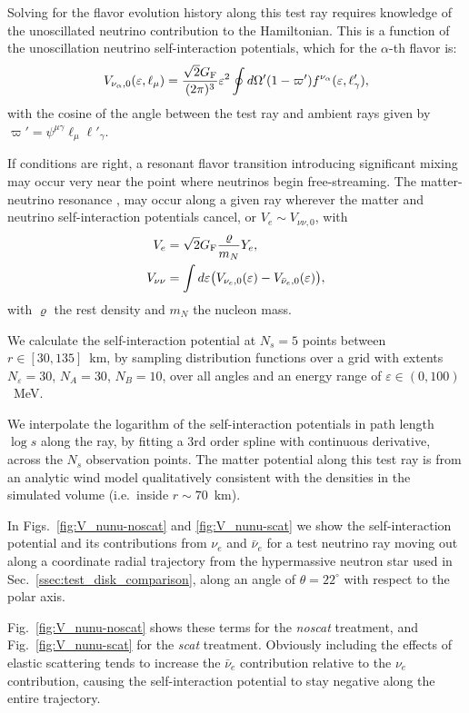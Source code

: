 \documentclass[aps,floatfix,prd,superscriptaddress,twocolumn]{revtex4-1}
\newcommand{\todo}[1]{\marginpar{\tiny{\textcolor{red}{#1}}}}
\renewcommand\todo[1]{} %
\begin{document}
Solving for the flavor evolution history along this test ray
requires knowledge of the unoscillated neutrino contribution to the Hamiltonian.
This is a function of the unoscillation neutrino self-interaction potentials,
which for the $\alpha$-th flavor is:
\begin{equation}
  \label{eqn:V_nu_alpha}
  V_{\nu_\alpha,0}(\varepsilon,\ell_\mu) =
  \frac{\sqrt{2}G_{\rm F}}{(2\pi)^3} \varepsilon^2
  \oint d\Omega'(1-\varpi')f^{\nu_\alpha}(\varepsilon,\ell'_\gamma),
\end{equation}
with the cosine of the angle between the test ray and ambient rays
given by $\varpi'=\psi^{\mu\gamma} \ell_\mu \ell'_\gamma$.

If conditions are right, a resonant flavor transition
introducing significant mixing may occur very near
the point where neutrinos begin free-streaming.
The matter-neutrino resonance \cite{malk2012-mnr_1,malk2015-mnr_2,malk2016-mnr_3},
may occur along a given ray wherever the matter and neutrino self-interaction
potentials cancel, or $V_e \sim V_{\nu\nu,0}$, with
\begin{align}
  \label{eqn:V_e}
  V_e &= \sqrt{2} G_{\rm F} \frac{\varrho}{m_N} Y_e, \\
  \label{eqn:V_nunu0}
  V_{\nu\nu} &= \int d\varepsilon
  \big(V_{\nu_e,0}(\varepsilon)-V_{\bar{\nu}_e,0}(\varepsilon)\big),
\end{align}
with $\varrho$ the rest density and $m_{N}$ the nucleon mass.

We calculate the self-interaction potential at $N_s=5$ points between
$r\in[30,135]$~km,
by sampling distribution functions over a grid with extents
$N_\varepsilon=30$, $N_A=30$, $N_B=10$,
over all angles and an energy range of $\varepsilon\in(0,100)$~MeV.
\todo{improve resolution and update}
We interpolate the logarithm of the self-interaction potentials
in path length $\log s$ along the ray,
by fitting a 3rd order spline with continuous derivative,
across the $N_s$ observation points.
The matter potential along this test ray is from an analytic wind
model qualitatively consistent with the densities in the
simulated volume (i.e.\ inside $r\sim70$~km).

In Figs.~\ref{fig:V_nunu-noscat} and \ref{fig:V_nunu-scat}
we show the self-interaction potential and its contributions from
$\nu_e$ and $\bar{\nu}_e$
for a test neutrino ray moving out along a coordinate radial trajectory
from the hypermassive neutron star used in Sec.~\ref{ssec:test_disk_comparison},
along an angle of $\theta=22^\circ$ with respect to the polar axis.
\todo{note coordinate ray}
Fig.~\ref{fig:V_nunu-noscat} shows these terms for the \emph{noscat} treatment,
and Fig.~\ref{fig:V_nunu-scat} for the \emph{scat} treatment.
Obviously including the effects of elastic scattering
tends to increase the $\bar{\nu}_e$ contribution relative to the $\nu_e$
contribution, causing the self-interaction potential to stay negative
along the entire trajectory.
\end{document}
